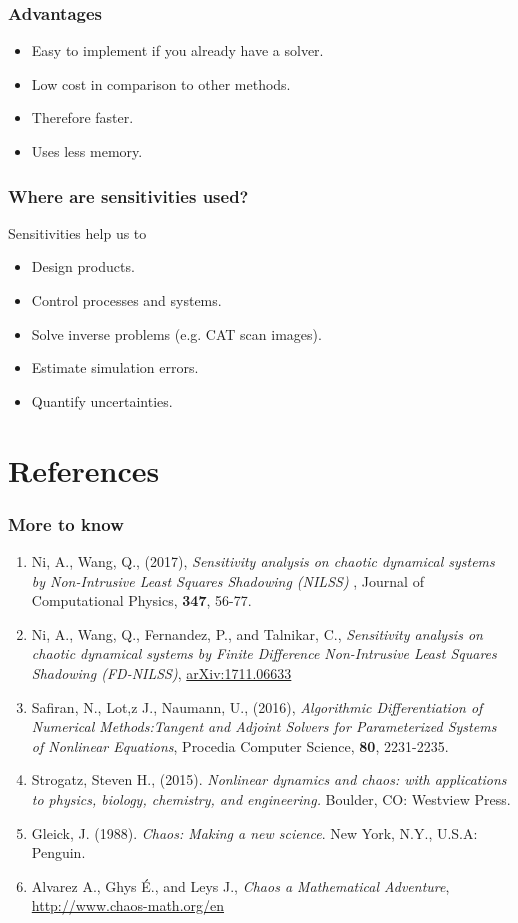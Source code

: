 \documentclass{beamer}
\begin{document}
\begin{frame}
  \frametitle{Advantages}
  \begin{itemize}
    \item Easy to implement if you already have a solver.
    \item Low cost in comparison to other methods.\pause
    \item Therefore faster.
    \item Uses less memory.
  \end{itemize}
\end{frame}

\begin{frame}
  \frametitle{Where are sensitivities used?}
  Sensitivities help us to\\
  \begin{itemize}
    \item Design products.
    \item Control processes and systems.
    \item Solve inverse problems (e.g. CAT scan images).
    \item Estimate simulation errors.
    \item Quantify uncertainties.
  \end{itemize}
\end{frame}


\section{References}
\begin{frame}
  \frametitle{More to know}
  \begin{scriptsize}
  \begin{enumerate}
    \item Ni, A., Wang, Q., (2017), \textit{Sensitivity analysis on chaotic dynamical systems by Non-Intrusive Least Squares Shadowing (NILSS)} , Journal of Computational Physics, \textbf{347}, 56-77.
    \item {Ni}, A., {Wang}, Q., {Fernandez}, P., and {Talnikar}, C., \textit{Sensitivity analysis on chaotic dynamical systems by Finite Difference Non-Intrusive Least Squares Shadowing (FD-NILSS)}, \url{arXiv:1711.06633}
    \item Safiran, N., Lot,z J., Naumann, U., (2016), \textit{Algorithmic Differentiation of Numerical Methods:Tangent and Adjoint Solvers for Parameterized Systems of Nonlinear Equations}, Procedia Computer Science, \textbf{80}, 2231-2235.
    \item Strogatz, Steven H., (2015). \textit{Nonlinear dynamics and chaos: with applications to physics, biology, chemistry, and engineering.} Boulder, CO: Westview Press.
    \item Gleick, J. (1988). \textit{Chaos: Making a new science}. New York, N.Y., U.S.A: Penguin.
    \item Alvarez A., Ghys É., and Leys J., \textit{Chaos a Mathematical Adventure}, \url{http://www.chaos-math.org/en}
  \end{enumerate}
\end{scriptsize}
\end{frame}
\end{document}

